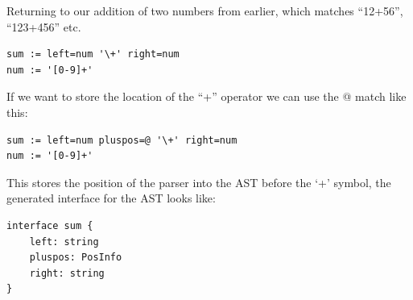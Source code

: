 Returning to our addition of two numbers from earlier, which matches
``12+56'', ``123+456'' etc.

\begin{verbatim}
sum := left=num '\+' right=num
num := '[0-9]+'
\end{verbatim}

If we want to store the location of the ``+'' operator we can use the @
match like this:

\begin{verbatim}
sum := left=num pluspos=@ '\+' right=num
num := '[0-9]+'
\end{verbatim}

This stores the position of the parser into the AST before the `+'
symbol, the generated interface for the AST looks like:

\begin{verbatim}
interface sum {
    left: string
    pluspos: PosInfo
    right: string
}
\end{verbatim}
